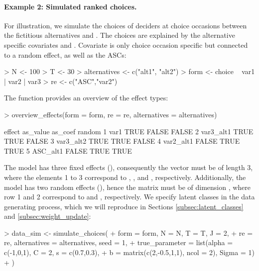 \documentclass[article,shortnames]{jss}
\newcommand{\fct}[1]{\code{#1()}}
\begin{document}
\paragraph{Example 2: Simulated ranked choices.} For illustration, we simulate the choices of  deciders at  choice occasions between the fictitious alternatives  and . The choices are explained by the alternative specific covariates  and . Covariate  is only choice occasion specific but connected to a random effect, as well as the ASCs:

\begin{Schunk}
\begin{Sinput}
> N <- 100
> T <- 30
> alternatives <- c("alt1", "alt2")
> form <- choice ~ var1 | var2 | var3
> re <- c("ASC","var2")
\end{Sinput}
\end{Schunk}

The \fct{overview\_effects} function provides an overview of the effect types:

\begin{Schunk}
\begin{Sinput}
> overview_effects(form = form, re = re, alternatives = alternatives)
\end{Sinput}
\begin{Soutput}
     effect as_value as_coef random
1      var1     TRUE   FALSE  FALSE
2 var3_alt1     TRUE    TRUE  FALSE
3 var3_alt2     TRUE    TRUE  FALSE
4 var2_alt1    FALSE    TRUE   TRUE
5  ASC_alt1    FALSE    TRUE   TRUE
\end{Soutput}
\end{Schunk}

The model has three fixed effects (), consequently the vector  must be of length 3, where the elements 1 to 3 correspond to , , and , respectively. Additionally, the model has two random effects (), hence the matrix  must be of dimension , where row 1 and 2 correspond to  and , respectively. We specify  latent classes in the data generating process, which we will reproduce in Sections \ref{subsec:latent_classes} and \ref{subsec:weight_update}:

\begin{Schunk}
\begin{Sinput}
> data_sim <- simulate_choices(
+    form = form, N = N, T = T, J = 2,
+    re = re, alternatives = alternatives, seed = 1,
+    true_parameter = list(alpha = c(-1,0,1), C = 2, s = c(0.7,0.3),
+                          b = matrix(c(2,-0.5,1,1), ncol = 2), Sigma = 1)
+  )
\end{Sinput}
\end{Schunk}
\end{document}
